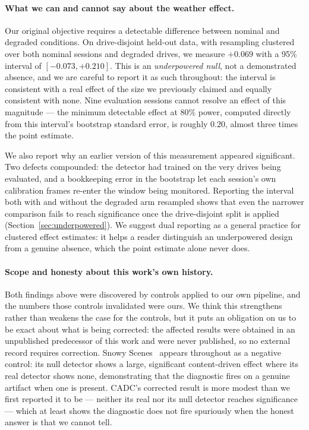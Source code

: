 \paragraph{What we can and cannot say about the weather effect.}
Our original objective requires a detectable difference between nominal and
degraded conditions. On drive-disjoint held-out data, with resampling
clustered over both nominal sessions and degraded drives, we measure
$+0.069$ with a 95\% interval of $[-0.073, +0.210]$. This is an
\emph{underpowered null}, not a demonstrated absence, and we are careful to
report it as such throughout: the interval is consistent with a real effect
of the size we previously claimed and equally consistent with none. Nine
evaluation sessions cannot resolve an effect of this magnitude --- the
minimum detectable effect at 80\% power, computed directly from this
interval's bootstrap standard error, is roughly $0.20$, almost three times
the point estimate.

We also report why an earlier version of this measurement appeared
significant. Two defects compounded: the detector had trained on the very
drives being evaluated, and a bookkeeping error in the bootstrap let each
session's own calibration frames re-enter the window being monitored.
Reporting the interval both with and without the degraded arm resampled
shows that even the narrower comparison fails to reach significance once
the drive-disjoint split is applied (Section~\ref{sec:underpowered}). We
suggest dual reporting as a general practice for clustered effect
estimates: it helps a reader distinguish an underpowered design from a
genuine absence, which the point estimate alone never does.

\paragraph{Scope and honesty about this work's own history.}
Both findings above were discovered by controls applied to our own
pipeline, and the numbers those controls invalidated were ours. We think
this strengthens rather than weakens the case for the controls, but it puts
an obligation on us to be exact about what is being corrected: the affected
results were obtained in an unpublished predecessor of this work and were
never published, so no external record requires correction. Snowy
Scenes~\cite{SnowyScenes2026} appears throughout as a negative control: its
null detector shows a large, significant content-driven effect where its
real detector shows none, demonstrating that the diagnostic fires on a
genuine artifact when one is present. CADC's corrected result is more
modest than we first reported it to be --- neither its real nor its null
detector reaches significance --- which at least shows the diagnostic does
not fire spuriously when the honest answer is that we cannot tell.
